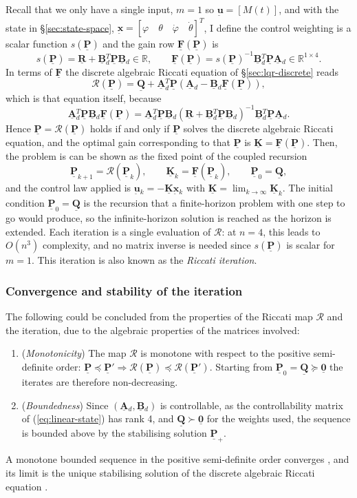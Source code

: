 \documentclass[12pt]{article}
\newcommand{\vb}[1]{{\underset{\tilde{}}{\mathbf{#1}}}}
\newcommand{\mb}[1]{\underline{\mathbf{#1}}}
\begin{document}
Recall that we only have a single input, $m = 1$ so $\vb{u} = [M(t)]$, and with the state in \S\ref{sec:state-space}, $\vb{x} = [\varphi \quad \theta \quad \dot{\varphi} \quad \dot{\theta}]^T$, I define the control weighting is a scalar function $s (\mb{P})$ and the gain row $\mb{F}(\mb{P})$ is
\[
s(\mb{P}) = \mb{R} + \mb{B}{}_d^T \mb{P} \mb{B}{}_d \in \mathbb{R},
\qquad
\mb{F}(\mb{P}) = s(\mb{P})^{-1} \mb{B}{}_d^T \mb{P} \mb{A}{}_d \in \mathbb{R}^{1 \times 4}.
\]
In terms of $\mb{F}$ the discrete algebraic Riccati equation of \S\ref{sec:lqr-discrete} reads
\[
\mathcal{R}(\mb{P}) = \mb{Q} + \mb{A}{}_d^T \mb{P} \left( \mb{A}{}_d - \mb{B}{}_d \mb{F}(\mb{P}) \right),
\]
which is that equation itself, because
\[
\mb{A}{}_d^T \mb{P} \mb{B}{}_d \mb{F}(\mb{P})
= \mb{A}{}_d^T \mb{P} \mb{B}{}_d \left( \mb{R} + \mb{B}{}_d^T \mb{P} \mb{B}{}_d \right)^{-1} \mb{B}{}_d^T \mb{P} \mb{A}{}_d .
\]
Hence $\mb{P} = \mathcal{R}(\mb{P})$ holds if and only if $\mb{P}$ solves the discrete algebraic Riccati equation, and the optimal gain corresponding to that $\mb{P}$ is $\mb{K} = \mb{F}(\mb{P})$. Then, the problem is can be shown as the fixed point of the coupled recursion
\[
\mb{P}_{k+1} = \mathcal{R}(\mb{P}_k), \qquad \mb{K}_k = \mb{F}(\mb{P}_k), \qquad \mb{P}_0 = \mb{Q},
\]
and the control law applied is $\vb{u}{}_k = -\mb{K}\vb{x}{}_k$ with $\mb{K} = \lim_{k\to\infty} \mb{K}_k$. The initial condition $\mb{P}_0 = \mb{Q}$ is the recursion that a finite-horizon problem with one step to go would produce, so the infinite-horizon solution is reached as the horizon is extended. Each iteration is a single evaluation of $\mathcal{R}$: at $n = 4$, this leads to $O(n^3)$ complexity, and no matrix inverse is needed since $s(\mb{P})$ is scalar for $m = 1$. This iteration is also known as the \textit{Riccati iteration}.

\subsubsection{Convergence and stability of the iteration}
\label{sec:convergence}
The following could be concluded from the properties of the Riccati map $\mathcal{R}$ and the iteration, due to the algebraic properties of the matrices involved:
\begin{enumerate}
    \item (\textit{Monotonicity}) The map $\mathcal{R}$ is monotone with respect to the positive semi-definite order: $\mb{P} \preceq \mb{P}' \Rightarrow \mathcal{R}(\mb{P}) \preceq \mathcal{R}(\mb{P}')$. Starting from $\mb{P}_0 = \mb{Q} \succeq \mb{0}$ the iterates are therefore non-decreasing.
    \item (\textit{Boundedness}) Since $(\mb{A}{}_d, \mb{B}{}_d)$ is controllable, as the controllability matrix of (\ref{eq:linear-state}) has rank 4, and $\mb{Q} \succ \mb{0}$ for the weights used, the sequence is bounded above by the stabilising solution $\mb{P}_+$.
\end{enumerate}
A monotone bounded sequence in the positive semi-definite order converges \cite{CainesMayne1970}, and its limit is the unique stabilising solution of the discrete algebraic Riccati equation \cite{Molinari1975}. 
\end{document}
